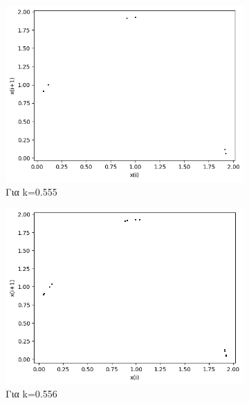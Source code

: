 \begin{figure}[h!]
\begin{subfigure}[b]{0.25\textwidth}
		\includegraphics[width=\textwidth]{LateX images/graphs q03/g9}
		\caption{Για k=0.555}
		\label{f:k21}
	\end{subfigure}
	\hfill
	\begin{subfigure}[b]{0.25\textwidth}
		\centering
		\includegraphics[width=\textwidth]{LateX images/graphs q03/g10}
		\caption{Για k=0.556}
		\label{f:k22}
	\end{subfigure}
	\hfill
	\begin{subfigure}[b]{0.25\textwidth}
		\centering

\end{subfigure}
\end{figure}
